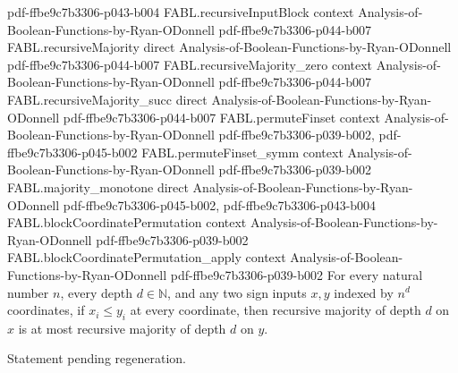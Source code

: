 \begin{theorem}
  {pdf-ffbe9c7b3306-p043-b004}
\proofstep
  {FABL.recursiveInputBlock}
  {context}
  {Analysis-of-Boolean-Functions-by-Ryan-ODonnell}
  {pdf-ffbe9c7b3306-p044-b007}
\proofstep
  {FABL.recursiveMajority}
  {direct}
  {Analysis-of-Boolean-Functions-by-Ryan-ODonnell}
  {pdf-ffbe9c7b3306-p044-b007}
\proofstep
  {FABL.recursiveMajority_zero}
  {context}
  {Analysis-of-Boolean-Functions-by-Ryan-ODonnell}
  {pdf-ffbe9c7b3306-p044-b007}
\proofstep
  {FABL.recursiveMajority_succ}
  {direct}
  {Analysis-of-Boolean-Functions-by-Ryan-ODonnell}
  {pdf-ffbe9c7b3306-p044-b007}
\proofstep
  {FABL.permuteFinset}
  {context}
  {Analysis-of-Boolean-Functions-by-Ryan-ODonnell}
  {pdf-ffbe9c7b3306-p039-b002,
    pdf-ffbe9c7b3306-p045-b002}
\proofstep
  {FABL.permuteFinset_symm}
  {context}
  {Analysis-of-Boolean-Functions-by-Ryan-ODonnell}
  {pdf-ffbe9c7b3306-p039-b002}
\proofstep
  {FABL.majority_monotone}
  {direct}
  {Analysis-of-Boolean-Functions-by-Ryan-ODonnell}
  {pdf-ffbe9c7b3306-p045-b002,
    pdf-ffbe9c7b3306-p043-b004}
\proofstep
  {FABL.blockCoordinatePermutation}
  {context}
  {Analysis-of-Boolean-Functions-by-Ryan-ODonnell}
  {pdf-ffbe9c7b3306-p039-b002}
\proofstep
  {FABL.blockCoordinatePermutation_apply}
  {context}
  {Analysis-of-Boolean-Functions-by-Ryan-ODonnell}
  {pdf-ffbe9c7b3306-p039-b002}
For every natural number $n$, every depth $d\in\mathbb{N}$, and any two sign inputs
$x,y$ indexed by $n^d$ coordinates, if $x_i\le y_i$ at every coordinate, then recursive
majority of depth $d$ on $x$ is at most recursive majority of depth $d$ on $y$.
\end{theorem}

\begin{theorem}
\label{FABL.recursiveMajority_odd}
\leanok
{}
Statement pending regeneration.
\end{theorem}

